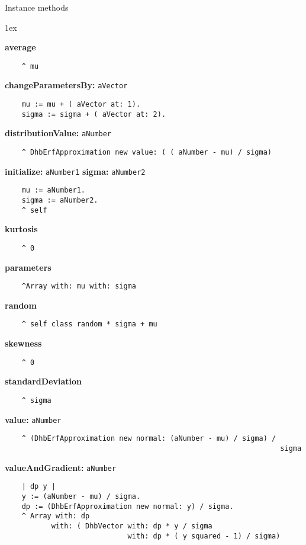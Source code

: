 Instance methods
{\parskip 1ex\par\noindent}
{\bf average}
\begin{verbatim}
    ^ mu
\end{verbatim}
{\bf changeParametersBy:} {\tt aVector}
\begin{verbatim}
    mu := mu + ( aVector at: 1).
    sigma := sigma + ( aVector at: 2).
\end{verbatim}
{\bf distributionValue:} {\tt aNumber}
\begin{verbatim}
    ^ DhbErfApproximation new value: ( ( aNumber - mu) / sigma)
\end{verbatim}
{\bf initialize:} {\tt aNumber1} {\bf sigma:} {\tt aNumber2}
\begin{verbatim}
    mu := aNumber1.
    sigma := aNumber2.
    ^ self
\end{verbatim}
{\bf kurtosis}
\begin{verbatim}
    ^ 0
\end{verbatim}
{\bf parameters}
\begin{verbatim}
    ^Array with: mu with: sigma

\end{verbatim}
{\bf random}
\begin{verbatim}
    ^ self class random * sigma + mu
\end{verbatim}
{\bf skewness}
\begin{verbatim}
    ^ 0
\end{verbatim}
{\bf standardDeviation}
\begin{verbatim}
    ^ sigma
\end{verbatim}
{\bf value:} {\tt aNumber}
\begin{verbatim}
    ^ (DhbErfApproximation new normal: (aNumber - mu) / sigma) / 
                                                                 sigma
\end{verbatim}
{\bf valueAndGradient:} {\tt aNumber}
\begin{verbatim}
    | dp y |
    y := (aNumber - mu) / sigma.
    dp := (DhbErfApproximation new normal: y) / sigma.
    ^ Array with: dp
           with: ( DhbVector with: dp * y / sigma
                             with: dp * ( y squared - 1) / sigma)
\end{verbatim}

